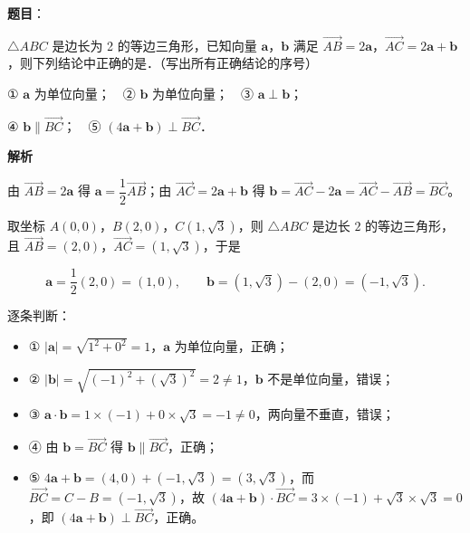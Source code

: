 \begin{answer}

\textbf{题目}：

\(\triangle ABC\) 是边长为 2 的等边三角形，已知向量 \(\boldsymbol{a}\)，\(\boldsymbol{b}\) 满足 \(\overrightarrow{AB}=2\boldsymbol{a}\)，\(\overrightarrow{AC}=2\boldsymbol{a}+\boldsymbol{b}\)，则下列结论中正确的是\gkblank{}．（写出所有正确结论的序号）

① \(\boldsymbol{a}\) 为单位向量；　② \(\boldsymbol{b}\) 为单位向量；　③ \(\boldsymbol{a}\perp\boldsymbol{b}\)；

④ \(\boldsymbol{b}\parallel\overrightarrow{BC}\)；　⑤ \((4\boldsymbol{a}+\boldsymbol{b})\perp\overrightarrow{BC}\)．

\textbf{解析}

由 \(\overrightarrow{AB}=2\boldsymbol{a}\) 得 \(\boldsymbol{a}=\dfrac{1}{2}\overrightarrow{AB}\)；由 \(\overrightarrow{AC}=2\boldsymbol{a}+\boldsymbol{b}\) 得 \(\boldsymbol{b}=\overrightarrow{AC}-2\boldsymbol{a}=\overrightarrow{AC}-\overrightarrow{AB}=\overrightarrow{BC}\)。

取坐标 \(A(0,0)\)，\(B(2,0)\)，\(C(1,\sqrt{3})\)，则 \(\triangle ABC\) 是边长 \(2\) 的等边三角形，且 \(\overrightarrow{AB}=(2,0)\)，\(\overrightarrow{AC}=(1,\sqrt{3})\)，于是

\nopagebreak[4]
\[
\boldsymbol{a}=\dfrac{1}{2}(2,0)=(1,0),\qquad \boldsymbol{b}=(1,\sqrt{3})-(2,0)=(-1,\sqrt{3}).
\]

逐条判断：

\begin{itemize}
\item ① \(|\boldsymbol{a}|=\sqrt{1^2+0^2}=1\)，\(\boldsymbol{a}\) 为单位向量，正确；
\item ② \(|\boldsymbol{b}|=\sqrt{(-1)^2+(\sqrt{3})^2}=2\neq1\)，\(\boldsymbol{b}\) 不是单位向量，错误；
\item ③ \(\boldsymbol{a}\cdot\boldsymbol{b}=1\times(-1)+0\times\sqrt{3}=-1\neq0\)，两向量不垂直，错误；
\item ④ 由 \(\boldsymbol{b}=\overrightarrow{BC}\) 得 \(\boldsymbol{b}\parallel\overrightarrow{BC}\)，正确；
\item ⑤ \(4\boldsymbol{a}+\boldsymbol{b}=(4,0)+(-1,\sqrt{3})=(3,\sqrt{3})\)，而 \(\overrightarrow{BC}=C-B=(-1,\sqrt{3})\)，故 \((4\boldsymbol{a}+\boldsymbol{b})\cdot\overrightarrow{BC}=3\times(-1)+\sqrt{3}\times\sqrt{3}=0\)，即 \((4\boldsymbol{a}+\boldsymbol{b})\perp\overrightarrow{BC}\)，正确。
\end{itemize}


\end{answer}
